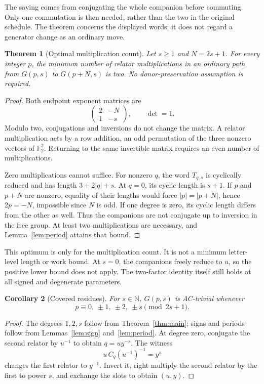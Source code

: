 \documentclass[11pt]{article}
\newtheorem{theorem}{Theorem}[section]
\newtheorem{corollary}[theorem]{Corollary}
\theoremstyle{definition}\newtheorem{definition}[theorem]{Definition}
\theoremstyle{remark}\newtheorem{remark}[theorem]{Remark}
\begin{document}
The saving comes from conjugating the whole companion before commuting. Only one commutation is then needed, rather than the two in the original schedule. The theorem concerns the displayed words; it does not regard a generator change as an ordinary move.

\begin{theorem}[Optimal multiplication count]\label{thm:periodminimal}
Let $s\ge1$ and $N=2s+1$. For every integer $p$, the minimum number of relator multiplications in an ordinary path from $G(p,s)$ to $G(p+N,s)$ is two. No donor-preservation assumption is required.
\end{theorem}
\begin{proof}
Both endpoint exponent matrices are
\[
\begin{pmatrix}2&-N\\1&-s\end{pmatrix},\qquad \det=1.
\]
Modulo two, conjugations and inversions do not change the matrix. A relator multiplication acts by a row addition, an odd permutation of the three nonzero vectors of $\mathbb F_2^2$. Returning to the same invertible matrix requires an even number of multiplications.

Zero multiplications cannot suffice. For nonzero $q$, the word $T_{q,s}$ is cyclically reduced and has length $3+2|q|+s$. At $q=0$, its cyclic length is $s+1$. If $p$ and $p+N$ are nonzero, equality of their lengths would force $|p|=|p+N|$, hence $2p=-N$, impossible since $N$ is odd. If one degree is zero, its cyclic length differs from the other as well. Thus the companions are not conjugate up to inversion in the free group. At least two multiplications are necessary, and Lemma~\ref{lem:period} attains that bound.
\end{proof}

This optimum is only for the multiplication count. It is not a minimum letter-level length or work bound. At $s=0$, the companions freely reduce to $u$, so the positive lower bound does not apply. The two-factor identity itself still holds at all signed and degenerate parameters.

\begin{corollary}[Covered residues]\label{cor:residues}
For $s\in\mathbb N$, $G(p,s)$ is AC-trivial whenever
\[
p\equiv0,\ \pm1,\ \pm2,\ \pm s\pmod{2s+1}.
\]
\end{corollary}
\begin{proof}
The degrees $1,2,s$ follow from Theorem~\ref{thm:main}; signs and periods follow from Lemmas~\ref{lem:sign} and~\ref{lem:period}. At degree zero, conjugate the second relator by $u^{-1}$ to obtain $q=uy^{-s}$. The witness
\[
u\,C_q(u^{-1})^{-1}=y^s
\]
changes the first relator to $y^{-1}$. Invert it, right multiply the second relator by the first to power $s$, and exchange the slots to obtain $(u,y)$.
\end{proof}
\end{document}
